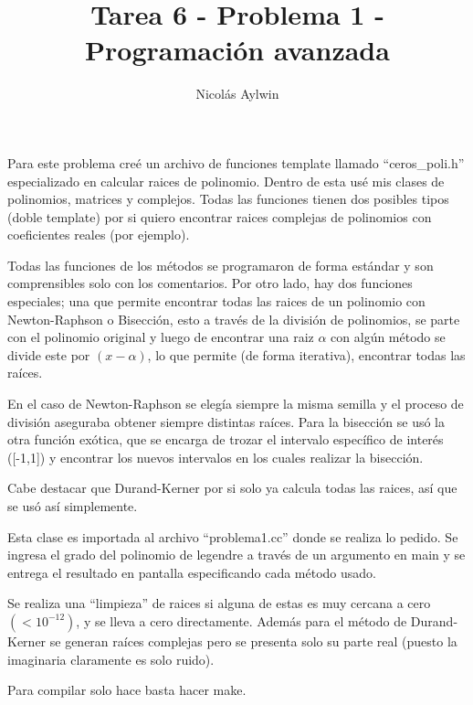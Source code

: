 \documentclass[12pt]{article}
\title{Tarea 6 - Problema 1 - Programación avanzada}
\author{Nicolás Aylwin}
\date{}
\begin{document}
\maketitle
Para este problema creé un archivo de funciones template llamado ``ceros\_poli.h'' especializado en calcular raices de polinomio. Dentro de esta usé mis clases de polinomios, matrices y complejos. Todas las funciones tienen dos posibles tipos (doble template) por si quiero encontrar raices complejas de polinomios con coeficientes reales (por ejemplo).

Todas las funciones de los métodos se programaron de forma estándar y son comprensibles solo con los comentarios. Por otro lado, hay dos funciones especiales; una que permite encontrar todas las raices de un polinomio con Newton-Raphson o Bisección, esto a través de la división de polinomios, se parte con el polinomio original y luego de encontrar una raiz $\alpha$ con algún método se divide este por $(x-\alpha)$, lo que permite (de forma iterativa), encontrar todas las raíces.

En el caso de Newton-Raphson se elegía siempre la misma semilla y el proceso de división aseguraba obtener siempre distintas raíces. Para la bisección se usó la otra función exótica, que se encarga de trozar el intervalo específico de interés ([-1,1]) y encontrar los nuevos intervalos en los cuales realizar la bisección.

Cabe destacar que Durand-Kerner por si solo ya calcula todas las raices, así que se usó así simplemente.

Esta clase es importada al archivo ``problema1.cc'' donde se realiza lo pedido. Se ingresa el grado del polinomio de legendre a través de un argumento en main y se entrega el resultado en pantalla especificando cada método usado.

Se realiza una ``limpieza'' de raices si alguna de estas es muy cercana a cero $(<10^{-12})$, y se lleva a cero directamente. Además para el método de Durand-Kerner se generan raíces complejas pero se presenta solo su parte real (puesto la imaginaria claramente es solo ruido).

Para compilar solo hace basta hacer make.
\end{document}
